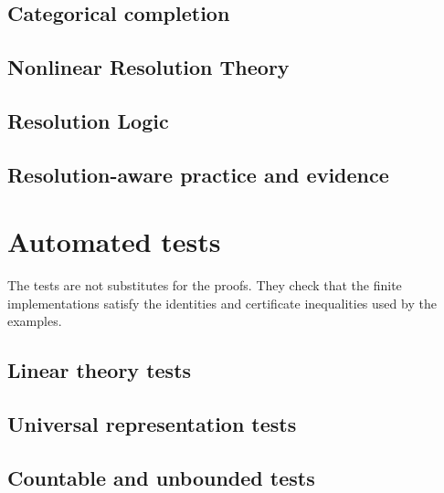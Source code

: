 \documentclass[11pt]{article}
\theoremstyle{definition}
\theoremstyle{remark}
\begin{document}
\clearpage
\subsection{Categorical completion}


\clearpage
\subsection{Nonlinear Resolution Theory}


\clearpage
\subsection{Resolution Logic}

\clearpage
\subsection{Resolution-aware practice and evidence}



\clearpage
\section{Automated tests}
\label{sec:resolution-tests}

The tests are not substitutes for the proofs.  They check that the finite implementations satisfy the identities and certificate inequalities used by the examples.

\subsection{Linear theory tests}


\clearpage
\subsection{Universal representation tests}


\clearpage
\subsection{Countable and unbounded tests}

\end{document}
